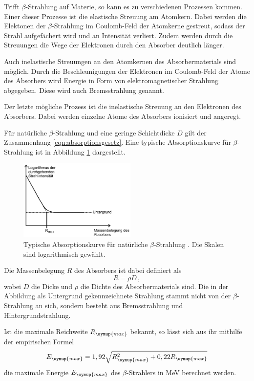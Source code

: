 Trifft $\beta$-Strahlung auf Materie, so kann es zu verschiedenen Prozessen kommen.
Einer dieser Prozesse ist die elastische Streuung am Atomkern. Dabei werden die
Elektonen der $\beta$-Strahlung im Coulomb-Feld der Atomkerne gestreut, sodass der
Strahl aufgefächert wird und an Intensität verliert. Zudem werden durch die Streuungen
die Wege der Elektronen durch den Absorber deutlich länger.

Auch inelastische Streuungen an den Atomkernen des Absorbermaterials sind möglich.
Durch die Beschleunigungen der Elektronen im Coulomb-Feld der Atome des Absorbers
wird Energie in Form von elektromagnetischer Strahlung abgegeben. Diese wird auch
Bremsstrahlung genannt.

Der letzte mögliche Prozess ist die inelastische Streuung an den Elektronen des
Absorbers. Dabei werden einzelne Atome des Absorbers ionisiert und angeregt.

Für natürliche $\beta$-Strahlung und eine geringe Schichtdicke $D$ gilt der
Zusammenhang \eqref{eqn:absorptionsgesetz}. Eine typische
Absorptionskurve für $\beta$-Strahlung ist in Abbildung \ref{fig:absorptionskurve}
dargestellt.

\begin{figure}
  \centering
  \includegraphics[height=4cm]{data/absorptionskurve.png}
  \caption{Typische Absorptionskurve für natürliche $\beta$-Strahlung \cite{Versuchsanleitung}.
  Die Skalen sind logarithmisch gewählt.}
  \label{fig:absorptionskurve}
\end{figure}

Die Massenbelegung $R$ des Absorbers ist dabei definiert als
\begin{equation}
  R=\rho D \,,
\end{equation}
wobei $D$ die Dicke und $\rho$ die Dichte des Absorbermaterials sind. Die in der Abbildung
als Untergrund gekennzeichnete Strahlung stammt nicht von der $\beta$-Strahlung an sich,
sondern besteht aus Bremsstrahlung und Hintergrundstrahlung.

Ist die maximale Reichweite $R_{\symup{max}}$ bekannt, so lässt sich aus ihr mithilfe
der empirischen Formel
\begin{equation}
  E_{\symup{max}}=1,92 \sqrt{R_{\symup{max}}^2+0,22 R_{\symup{max}}}
  \label{eqn:emax}
\end{equation}
die maximale Energie $E_{\symup{max}}$ des $\beta$-Strahlers in MeV berechnet werden.
